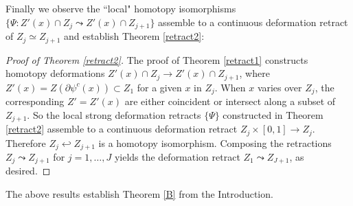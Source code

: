 \documentclass[12pt]{amsart}
\theoremstyle{definition}
\theoremstyle{remark}
\newcommand{\bR}{\mathbb{R}}
\newcommand{\del}{\partial}
\begin{document}
Finally we observe the ``local" homotopy isomorphisms $\{\Psi: Z'(x) \cap Z_j \leadsto Z'(x) \cap Z_{j+1}\}$ assemble to a continuous deformation retract of $Z_j \simeq Z_{j+1}$ and establish Theorem \ref{retract2}:

\begin{proof}[Proof of Theorem \ref{retract2}]
The proof of Theorem \ref{retract1} constructs homotopy deformations $Z'(x) \cap Z_j \to Z'(x) \cap Z_{j+1}$, where $Z'(x)=Z(\del \psi^c (x)) \subset Z_1$ for a given $x$ in $Z_j$. When $x$ varies over $Z_j$, the corresponding $Z'=Z'(x)$ are either coincident or intersect along a subset of $Z_{j+1}$. So the local strong deformation retracts $\{\Psi\}$ constructed in Theorem \ref{retract2} assemble to a continuous deformation retract $Z_j \times [0,1] \to Z_j$. Therefore $Z_j \hookleftarrow Z_{j+1}$ is a homotopy isomorphism. Composing the retractions $Z_j \leadsto Z_{j+1}$ for $j=1,\ldots, J$ yields the deformation retract $Z_1 \leadsto Z_{J+1}$, as desired. 
\end{proof}

The above results establish Theorem \ref{B} from the Introduction.












\end{document}
